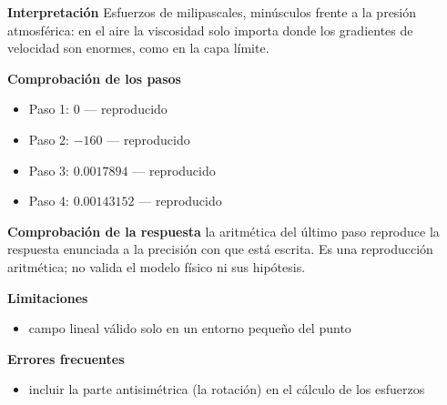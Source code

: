 \documentclass[10pt,openany]{book}
\begin{document}
\begin{tcolorbox}[title={Problema resuelto}, studiumworked, breakable]
\noindent\textbf{Interpretación}
Esfuerzos de milipascales, minúsculos frente a la presión atmosférica: en el aire la viscosidad solo importa donde los gradientes de velocidad son enormes, como en la capa límite.

\noindent\textbf{Comprobación de los pasos}
\begin{itemize}
\item Paso 1: $0$ — reproducido
\item Paso 2: $-160$ — reproducido
\item Paso 3: $0.0017894$ — reproducido
\item Paso 4: $0.00143152$ — reproducido
\end{itemize}

\noindent\textbf{Comprobación de la respuesta} la aritmética del último paso reproduce la respuesta enunciada a la precisión con que está escrita. Es una reproducción aritmética; no valida el modelo físico ni sus hipótesis.

\noindent\textbf{Limitaciones}
\begin{itemize}
\item campo lineal válido solo en un entorno pequeño del punto
\end{itemize}

\noindent\textbf{Errores frecuentes}
\begin{itemize}
\item incluir la parte antisimétrica (la rotación) en el cálculo de los esfuerzos
\end{itemize}
\end{tcolorbox}
\end{document}
